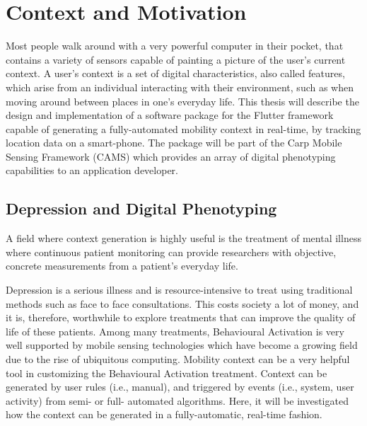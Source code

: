 \section{Context and Motivation}


Most people walk around with a very powerful computer in their pocket, that contains a variety of sensors capable of painting a picture of the user's current context. A user's context is a set of digital characteristics, also called features, which arise from an individual interacting with their environment, such as when moving around between places in one's everyday life. This thesis will describe the design and implementation of a software package for the Flutter framework capable of generating a fully-automated mobility context in real-time, by tracking location data on a smart-phone. The package will be part of the Carp Mobile Sensing Framework (CAMS) which provides an array of digital phenotyping capabilities to an application developer.\\

\subsection{Depression and Digital Phenotyping}
A field where context generation is highly useful is the treatment of mental illness where continuous patient monitoring can provide researchers with objective, concrete measurements from a patient's everyday life.

Depression is a serious illness and is resource-intensive to treat using traditional methods such as face to face consultations. This costs society a lot of money, and it is, therefore, worthwhile to explore treatments that can improve the quality of life of these patients. Among many treatments, Behavioural Activation is very well supported by mobile sensing technologies which have become a growing field due to the rise of ubiquitous computing. Mobility context can be a very helpful tool in customizing the Behavioural Activation treatment. Context can be generated by user rules (i.e., manual), and triggered by events (i.e., system, user activity) from semi- or full- automated algorithms. Here, it will be investigated how the context can be generated in a fully-automatic, real-time fashion.\\

